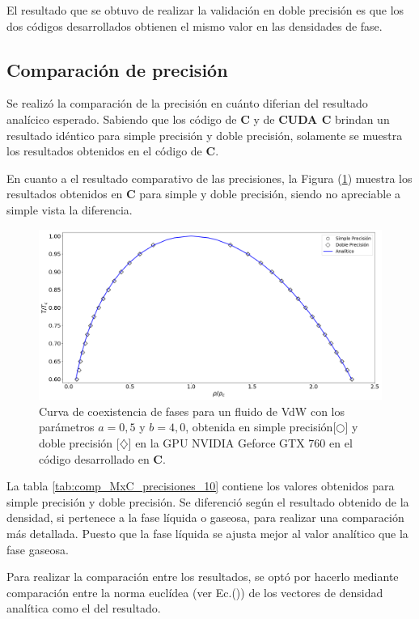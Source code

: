 El resultado que se obtuvo de realizar la validación en doble precisión es que los dos códigos desarrollados obtienen el mismo valor en las densidades de fase.

\newpage
\subsection{Comparación de precisión}
Se realizó la comparación de la precisión en cuánto diferian del resultado analícico esperado. Sabiendo que los código de \textbf{C} y de \textbf{CUDA C} brindan un resultado idéntico para simple precisión y doble precisión, solamente se muestra los resultados obtenidos en el código de \textbf{C}.

En cuanto a el resultado comparativo de las precisiones, la Figura (\ref{fig:v_760_MxC_c_comparacion}) muestra los resultados obtenidos en \textbf{C} para simple y doble precisión, siendo no apreciable a simple vista la diferencia.

\begin{figure}[h!]
	\centering
	\includegraphics[width=\textwidth]{figs/cap4/v_760_MxC_c_comparacion}
	\caption{Curva de coexistencia de fases para un fluido de VdW con los parámetros $a = 0,5 $ y $b = 4,0 $, obtenida en simple precisión[$\bigcirc$] y doble precisión [$\diamondsuit$] en la GPU NVIDIA Geforce GTX 760 en el código desarrollado en \textbf{C}.} 
	\label{fig:v_760_MxC_c_comparacion}	
\end{figure}


La tabla \ref{tab:comp_MxC_precisiones_10} contiene los valores obtenidos para simple precisión y doble precisión. Se diferenció según el resultado obtenido de la densidad, si pertenece a la fase líquida o gaseosa, para realizar una comparación más detallada. Puesto que la fase líquida se ajusta mejor al valor analítico que la fase gaseosa.

Para realizar la comparación entre los resultados, se optó por hacerlo mediante comparación entre la norma euclídea (ver Ec.()) de los vectores de densidad analítica como el del resultado.

